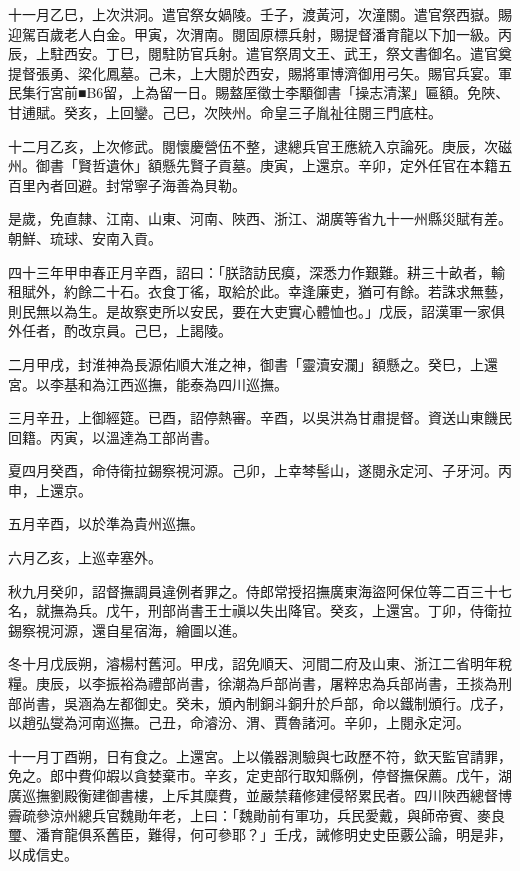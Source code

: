 \begin{pinyinscope}
十一月乙巳，上次洪洞。遣官祭女媧陵。壬子，渡黃河，次潼關。遣官祭西嶽。賜迎駕百歲老人白金。甲寅，次渭南。閱固原標兵射，賜提督潘育龍以下加一級。丙辰，上駐西安。丁巳，閱駐防官兵射。遣官祭周文王、武王，祭文書御名。遣官奠提督張勇、梁化鳳墓。己未，上大閱於西安，賜將軍博濟御用弓矢。賜官兵宴。軍民集行宮前■B6留，上為留一日。賜盩厔徵士李顒御書「操志清潔」匾額。免陜、甘逋賦。癸亥，上回鑾。己巳，次陜州。命皇三子胤祉往閱三門底柱。

十二月乙亥，上次修武。閱懷慶營伍不整，逮總兵官王應統入京論死。庚辰，次磁州。御書「賢哲遺休」額懸先賢子貢墓。庚寅，上還京。辛卯，定外任官在本籍五百里內者回避。封常寧子海善為貝勒。

是歲，免直隸、江南、山東、河南、陜西、浙江、湖廣等省九十一州縣災賦有差。朝鮮、琉球、安南入貢。

四十三年甲申春正月辛酉，詔曰：「朕諮訪民瘼，深悉力作艱難。耕三十畝者，輸租賦外，約餘二十石。衣食丁徭，取給於此。幸逢廉吏，猶可有餘。若誅求無藝，則民無以為生。是故察吏所以安民，要在大吏實心體恤也。」戊辰，詔漢軍一家俱外任者，酌改京員。己巳，上謁陵。

二月甲戌，封淮神為長源佑順大淮之神，御書「靈瀆安瀾」額懸之。癸巳，上還宮。以李基和為江西巡撫，能泰為四川巡撫。

三月辛丑，上御經筵。已酉，詔停熱審。辛酉，以吳洪為甘肅提督。資送山東饑民回籍。丙寅，以溫達為工部尚書。

夏四月癸酉，命侍衛拉錫察視河源。己卯，上幸棽髻山，遂閱永定河、子牙河。丙申，上還京。

五月辛酉，以於準為貴州巡撫。

六月乙亥，上巡幸塞外。

秋九月癸卯，詔督撫調員違例者罪之。侍郎常授招撫廣東海盜阿保位等二百三十七名，就撫為兵。戊午，刑部尚書王士禛以失出降官。癸亥，上還宮。丁卯，侍衛拉錫察視河源，還自星宿海，繪圖以進。

冬十月戊辰朔，濬楊村舊河。甲戌，詔免順天、河間二府及山東、浙江二省明年稅糧。庚辰，以李振裕為禮部尚書，徐潮為戶部尚書，屠粹忠為兵部尚書，王掞為刑部尚書，吳涵為左都御史。癸未，頒內制銅斗銅升於戶部，命以鐵制頒行。戊子，以趙弘燮為河南巡撫。己丑，命濬汾、渭、賈魯諸河。辛卯，上閱永定河。

十一月丁酉朔，日有食之。上還宮。上以儀器測驗與七政歷不符，欽天監官請罪，免之。郎中費仰嘏以貪婪棄市。辛亥，定吏部行取知縣例，停督撫保薦。戊午，湖廣巡撫劉殿衡建御書樓，上斥其糜費，並嚴禁藉修建侵帑累民者。四川陜西總督博霽疏參涼州總兵官魏勛年老，上曰：「魏勛前有軍功，兵民愛戴，與師帝賓、麥良璽、潘育龍俱系舊臣，難得，何可參耶？」壬戌，誡修明史史臣覈公論，明是非，以成信史。


\end{pinyinscope}
